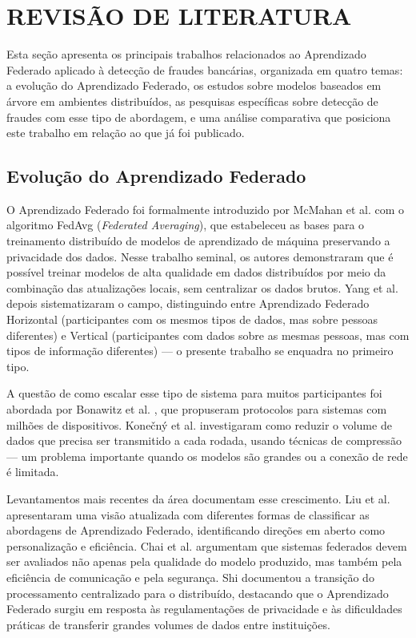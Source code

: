 \section{REVISÃO DE LITERATURA}

Esta seção apresenta os principais trabalhos relacionados ao Aprendizado Federado aplicado à detecção de fraudes bancárias, organizada em quatro temas: a evolução do Aprendizado Federado, os estudos sobre modelos baseados em árvore em ambientes distribuídos, as pesquisas específicas sobre detecção de fraudes com esse tipo de abordagem, e uma análise comparativa que posiciona este trabalho em relação ao que já foi publicado.

\subsection{Evolução do Aprendizado Federado}

O Aprendizado Federado foi formalmente introduzido por McMahan et al. \cite{mcmahan2017fedavg} com o algoritmo FedAvg (\textit{Federated Averaging}), que estabeleceu as bases para o treinamento distribuído de modelos de aprendizado de máquina preservando a privacidade dos dados. Nesse trabalho seminal, os autores demonstraram que é possível treinar modelos de alta qualidade em dados distribuídos por meio da combinação das atualizações locais, sem centralizar os dados brutos. Yang et al. \cite{yang2019fl} depois sistematizaram o campo, distinguindo entre Aprendizado Federado Horizontal (participantes com os mesmos tipos de dados, mas sobre pessoas diferentes) e Vertical (participantes com dados sobre as mesmas pessoas, mas com tipos de informação diferentes) --- o presente trabalho se enquadra no primeiro tipo.

A questão de como escalar esse tipo de sistema para muitos participantes foi abordada por Bonawitz et al. \cite{bonawitz2019scale}, que propuseram protocolos para sistemas com milhões de dispositivos. Konečný et al. \cite{konecny2016communication} investigaram como reduzir o volume de dados que precisa ser transmitido a cada rodada, usando técnicas de compressão --- um problema importante quando os modelos são grandes ou a conexão de rede é limitada.

Levantamentos mais recentes da área documentam esse crescimento. Liu et al. \cite{liu2024survey} apresentaram uma visão atualizada com diferentes formas de classificar as abordagens de Aprendizado Federado, identificando direções em aberto como personalização e eficiência. Chai et al. \cite{chai2024survey} argumentam que sistemas federados devem ser avaliados não apenas pela qualidade do modelo produzido, mas também pela eficiência de comunicação e pela segurança. Shi \cite{shi2023survey} documentou a transição do processamento centralizado para o distribuído, destacando que o Aprendizado Federado surgiu em resposta às regulamentações de privacidade e às dificuldades práticas de transferir grandes volumes de dados entre instituições.

